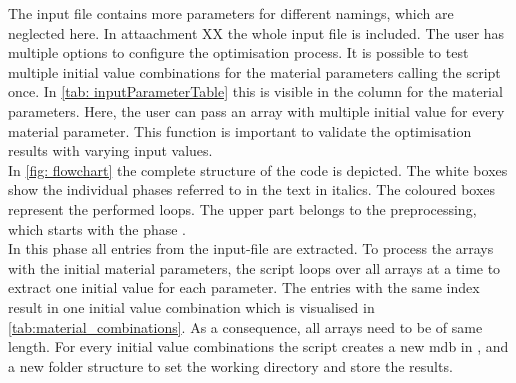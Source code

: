 The input file contains more parameters for different namings, which are neglected here. In attaachment XX the whole input file is included. 
The user has multiple options to configure the optimisation process. It is possible to test multiple initial value combinations for the material parameters calling the script once. In \autoref{tab: inputParameterTable} this is visible in the column  for the material parameters.
Here, the user can pass an array with multiple initial value for every material parameter.
This function is important to validate the optimisation results with varying input values. \\
\indent In \autoref{fig: flowchart} the complete structure of the code is depicted. The white boxes show the individual phases referred to in the text in italics. The coloured boxes represent the performed loops. 
The upper part belongs to the preprocessing, which starts with the phase . \\
\indent In this phase all entries from the input-file are extracted. 
To process the arrays with the initial material parameters, the script loops over all arrays at a time to extract one initial value for each parameter.
The entries with the same index result in one initial value combination which is visualised in \autoref{tab:material_combinations}.
As a consequence, all arrays need to be of same length. For every initial value combinations the script creates a new \acrfull{mdb} in , and a new folder structure to set the working directory and store the results.

